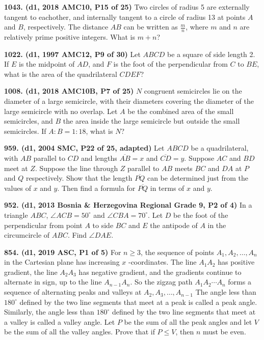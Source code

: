 \documentclass{article}
\begin{document}
\textbf{1043. (\color{red}d1\color{black}, 2018 AMC10, P15 of 25)} Two circles of radius 5 are externally tangent to eachother, and internally tangent to a circle of radius 13 at points $A$ and $B$, respectively. The distance $AB$ can be written as $\frac{m}{n}$, where $m$ and $n$ are relatively prime positive integers. What is $m + n$?

\textbf{1022. (\color{red}d1\color{black}, 1997 AMC12, P9 of 30)} Let $ABCD$ be a square of side length 2. If $E$ is the midpoint of $AD$, and $F$ is the foot of the perpendicular from $C$ to $BE$, what is the area of the quadrilateral $CDEF$?

\textbf{1008. (\color{red}d1\color{black}, 2018 AMC10B, P7 of 25)} $N$ congruent semicircles lie on the diameter of a large semicircle, with their diameters covering the diameter of the large semicircle with no overlap. Let $A$ be the combined area of the small semicircles, and $B$ the area inside the large semicircle but outside the small semicircles. If $A:B = 1:18$, what is $N$?

\textbf{959. (\color{red}d1\color{black}, 2004 SMC, P22 of 25, adapted)} Let $ABCD$ be a quadrilateral, with $AB$ parallel to $CD$ and lengths $\overline{AB}=x$ and $\overline{CD}=y$. Suppose $AC$ and $BD$ meet at $Z$. Suppose the line through $Z$ parallel to $AB$ meets $BC$ and $DA$ at $P$ and $Q$ respectively. Show that the length $\overline{PQ}$ can be determined just from the values of $x$ and $y$. Then find a formula for $\overline{PQ}$ in terms of $x$ and $y$.

\textbf{952. (\color{red}d1\color{black}, 2013 Bosnia \& Herzegovina Regional Grade 9, P2 of 4)} In a triangle $ABC$, $\angle ACB = 50^\circ$ and $\angle CBA = 70^\circ$. Let $D$ be the foot of the perpendicular from point $A$ to side $BC$ and $E$ the antipode of $A$ in the circumcircle of $ABC$. Find $\angle DAE$.

\textbf{854. (\color{red}d1\color{black}, 2019 ASC, P1 of 5)} For $n \geq 3$, the sequence of points $A_{1}, A_{2}, \ldots, A_{n}$ in the Cartesian plane has increasing $x$ -coordinates. The line $A_{1} A_{2}$ has positive gradient, the line $A_{2} A_{3}$ has negative gradient, and the gradients continue to alternate in sign, up to the line $A_{n-1} A_{n} .$ So the zigzag path $A_{1} A_{2} \cdots A_{n}$ forms a sequence of alternating peaks and valleys at $A_{2}, A_{3}, \ldots, A_{n-1}$
\smallbreak
The angle less than $180^{\circ}$ defined by the two line segments that meet at a peak is called a peak angle. Similarly, the angle less than $180^{\circ}$ defined by the two line segments that meet at a valley is called a valley angle. Let $P$ be the sum of all the peak angles and let $V$ be the sum of all the valley angles.
\smallbreak
Prove that if $P \leq V$, then $n$ must be even.
\end{document}
